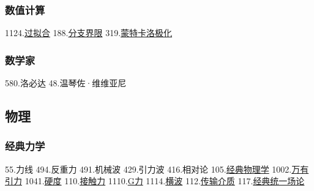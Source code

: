 \subsubsection{数值计算}
1124.\href{https://wuli.wiki/assets/sogou/1124.\%E8\%BF\%87\%E6\%8B\%9F\%E5\%90\%88\%20-\%20\%E6\%90\%9C\%E7\%8B\%97\%E7\%A7\%91\%E5\%AD\%A6\%E7\%99\%BE\%E7\%A7\%91.html}{过拟合}
188.\href{https://wuli.wiki/assets/sogou/188.\%E5\%88\%86\%E6\%94\%AF\%E7\%95\%8C\%E9\%99\%90\%20-\%20\%E6\%90\%9C\%E7\%8B\%97\%E7\%A7\%91\%E5\%AD\%A6\%E7\%99\%BE\%E7\%A7\%91.html}{分支界限}
319.\href{https://wuli.wiki/assets/sogou/319.\%E8\%92\%99\%E7\%89\%B9\%E5\%8D\%A1\%E6\%B4\%9B\%E6\%9E\%81\%E5\%8C\%96\%20-\%20\%E6\%90\%9C\%E7\%8B\%97\%E7\%A7\%91\%E5\%AD\%A6\%E7\%99\%BE\%E7\%A7\%91.html}{蒙特卡洛极化}
\subsubsection{数学家}
580.洛必达
48.温琴佐·维维亚尼
\subsection{物理}
\subsubsection{经典力学}
55.力线
494.反重力
491.机械波
429.引力波
416.相对论
105.\href{https://wuli.wiki/assets/sogou/105.\%E7\%BB\%8F\%E5\%85\%B8\%E7\%89\%A9\%E7\%90\%86\%E5\%AD\%A6\%20-\%20\%E6\%90\%9C\%E7\%8B\%97\%E7\%A7\%91\%E5\%AD\%A6\%E7\%99\%BE\%E7\%A7\%91.html}{经典物理学}
1002.\href{https://wuli.wiki/assets/sogou/1002.\%E4\%B8\%87\%E6\%9C\%89\%E5\%BC\%95\%E5\%8A\%9B\%20-\%20\%E6\%90\%9C\%E7\%8B\%97\%E7\%A7\%91\%E5\%AD\%A6\%E7\%99\%BE\%E7\%A7\%91.html}{万有引力}
1041.\href{https://wuli.wiki/assets/sogou/1041.\%E7\%A1\%AC\%E5\%BA\%A6\%20-\%20\%E6\%90\%9C\%E7\%8B\%97\%E7\%A7\%91\%E5\%AD\%A6\%E7\%99\%BE\%E7\%A7\%91.html}{硬度}
110.\href{https://wuli.wiki/assets/sogou/110.\%E6\%8E\%A5\%E8\%A7\%A6\%E5\%8A\%9B\%20-\%20\%E6\%90\%9C\%E7\%8B\%97\%E7\%A7\%91\%E5\%AD\%A6\%E7\%99\%BE\%E7\%A7\%91.html}{接触力}
1110.\href{https://wuli.wiki/assets/sogou/1110.G\%E5\%8A\%9B\%20-\%20\%E6\%90\%9C\%E7\%8B\%97\%E7\%A7\%91\%E5\%AD\%A6\%E7\%99\%BE\%E7\%A7\%91.html}{G力}
1114.\href{https://wuli.wiki/assets/sogou/1114.\%E6\%A8\%AA\%E6\%B3\%A2\%20-\%20\%E6\%90\%9C\%E7\%8B\%97\%E7\%A7\%91\%E5\%AD\%A6\%E7\%99\%BE\%E7\%A7\%91.html}{横波}
112.\href{https://wuli.wiki/assets/sogou/112.\%E4\%BC\%A0\%E8\%BE\%93\%E4\%BB\%8B\%E8\%B4\%A8\%20-\%20\%E6\%90\%9C\%E7\%8B\%97\%E7\%A7\%91\%E5\%AD\%A6\%E7\%99\%BE\%E7\%A7\%91.html}{传输介质}
117.\href{https://wuli.wiki/assets/sogou/117.\%E7\%BB\%8F\%E5\%85\%B8\%E7\%BB\%9F\%E4\%B8\%80\%E5\%9C\%BA\%E8\%AE\%BA\%20-\%20\%E6\%90\%9C\%E7\%8B\%97\%E7\%A7\%91\%E5\%AD\%A6\%E7\%99\%BE\%E7\%A7\%91.html}{经典统一场论}
